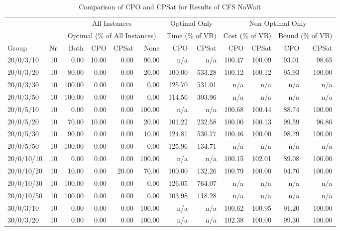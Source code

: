 \begin{table}[htbp]
\caption{\label{tab:comparecfsnowait}Comparison of CPO and CPSat for Results of CFS NoWait}
{\scriptsize
\begin{tabular}{lr*{10}{r}} \toprule
& &\multicolumn{4}{c}{All Instances} & \multicolumn{2}{c}{Optimal Only} & \multicolumn{4}{c}{Non Optimal Only}\\ 
& &\multicolumn{4}{c}{Optimal (\% of All Instances)} & \multicolumn{2}{c}{Time (\% of VB)} & \multicolumn{2}{c}{Cost (\% of VB)} & \multicolumn{2}{c}{Bound (\% of VB)}\\ 
Group & Nr & Both & CPO & CPSat & None & CPO & CPSat & CPO & CPSat & CPO & CPSat\\ \midrule
20/0/3/10 & 10 &  0.00 & 10.00 &  0.00 & 90.00 & n/a & n/a & 100.47 & 100.09 & 93.01 & 98.65 \\ 
20/0/3/20 & 10 & 80.00 &  0.00 &  0.00 & 20.00 & 100.00 & 533.28 & 100.12 & 100.12 & 95.93 & 100.00 \\ 
20/0/3/30 & 10 & 100.00 &  0.00 &  0.00 &  0.00 & 125.70 & 531.01 & n/a & n/a & n/a & n/a \\ 
20/0/3/50 & 10 & 100.00 &  0.00 &  0.00 &  0.00 & 114.56 & 303.96 & n/a & n/a & n/a & n/a \\ 
20/0/5/10 & 10 &  0.00 &  0.00 &  0.00 & 100.00 & n/a & n/a & 100.68 & 100.44 & 88.74 & 100.00 \\ 
20/0/5/20 & 10 & 70.00 & 10.00 &  0.00 & 20.00 & 101.22 & 232.58 & 100.00 & 100.13 & 99.59 & 96.86 \\ 
20/0/5/30 & 10 & 90.00 &  0.00 &  0.00 & 10.00 & 124.81 & 530.77 & 100.46 & 100.00 & 98.79 & 100.00 \\ 
20/0/5/50 & 10 & 100.00 &  0.00 &  0.00 &  0.00 & 125.96 & 134.71 & n/a & n/a & n/a & n/a \\ 
20/0/10/10 & 10 &  0.00 &  0.00 &  0.00 & 100.00 & n/a & n/a & 100.15 & 102.01 & 89.08 & 100.00 \\ 
20/0/10/20 & 10 & 10.00 &  0.00 & 20.00 & 70.00 & 100.00 & 132.26 & 100.79 & 100.00 & 94.76 & 100.00 \\ 
20/0/10/30 & 10 & 100.00 &  0.00 &  0.00 &  0.00 & 126.05 & 764.07 & n/a & n/a & n/a & n/a \\ 
20/0/10/50 & 10 & 100.00 &  0.00 &  0.00 &  0.00 & 103.98 & 118.28 & n/a & n/a & n/a & n/a \\ 
30/0/3/10 & 10 &  0.00 &  0.00 &  0.00 & 100.00 & n/a & n/a & 100.62 & 100.95 & 91.20 & 100.00 \\ 
30/0/3/20 & 10 &  0.00 &  0.00 &  0.00 & 100.00 & n/a & n/a & 102.38 & 100.00 & 99.30 & 100.00 \\ 

\end{tabular}}
\end{table}
